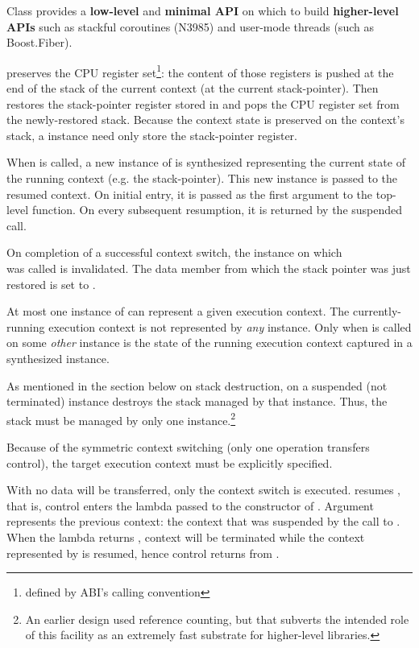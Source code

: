 Class \ectx provides a {\bfseries low-level} and {\bfseries minimal API} on
which to build {\bfseries higher-level APIs} such as stackful coroutines
(N3985\cite{N3985}) and user-mode threads (such as Boost.Fiber\cite{bfiber}).


\ectxop preserves the CPU register set\footnote{defined by ABI's calling
convention}: the content of those registers is pushed at the end of the stack
of the current context (at the current stack-pointer). Then \op restores the
stack-pointer register stored in  and pops the CPU register set
from the newly-restored stack.
Because the context state is preserved on the context's stack, a \ectx
instance need only store the stack-pointer register.


When \ectxop is called, a new instance of \ectx is synthesized representing
the current state of the running context (e.g. the stack-pointer). This new
instance is passed to the resumed context. On initial entry, it is passed as
the first argument to the top-level function. On every subsequent resumption,
it is returned by the suspended \op call.

On completion of a successful context switch, the \ectx instance on which\\
\op was called is invalidated. The data member from which the stack pointer was
just restored is set to .

At most one instance of \ectx can represent a given execution context. The
currently-running execution context is not represented by \emph{any} \ectx
instance. Only when \op is called on some \emph{other} \ectx instance is the
state of the running execution context captured in a synthesized \ectx
instance.

As mentioned in the section below on stack
destruction,  on a suspended (not terminated)
instance destroys the stack managed by that instance. Thus, the stack must be
managed by only one \ectx instance.\footnote{An earlier design used reference
counting, but that subverts the intended role of this facility as an extremely
fast substrate for higher-level libraries.}

Because of the symmetric context switching (only one operation transfers
control), the target execution context must be explicitly specified.


With  no data will be transferred, only the
context switch is executed.
 resumes , that is, control enters the lambda passed to
the constructor of . Argument  represents the previous
context: the context that was suspended by the call to . When the
lambda returns , context  will be terminated while the
context represented by  is resumed, hence control returns
from .\\


